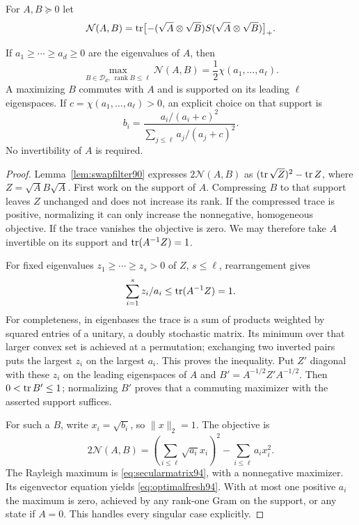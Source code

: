 For $A,B\succeq0$ let
\[
 \mathcal N(A,B)=\operatorname{tr}\bigl[-(\sqrt A\otimes\sqrt B)S
                                  (\sqrt A\otimes\sqrt B)\bigr]_+.
\]
\begin{lemma}
\label{lem:spectralleaf94}
If $a_1\ge\cdots\ge a_d\ge0$ are the eigenvalues of $A$, then
\begin{equation}\label{eq:spectralleaf94}
 \max_{B\in\mathcal D_d,\ \operatorname{rank}B\le\ell}
                  \mathcal N(A,B)
           =\frac12\chi(a_1,\ldots,a_\ell).
\end{equation}
A maximizing $B$ commutes with $A$ and is supported on its leading
$\ell$ eigenspaces.  If $c=\chi(a_1,\ldots,a_\ell)>0$, an explicit
choice on that support is
\begin{equation}\label{eq:optimalfresh94}
 b_i=\frac{a_i/(a_i+c)^2}{\sum_{j\le\ell}a_j/(a_j+c)^2}.
\end{equation}
No invertibility of $A$ is required.
\end{lemma}
\begin{proof}
Lemma~\ref{lem:swapfilter90} expresses $2\mathcal N(A,B)$ as
$(\operatorname{tr}\sqrt Z)^2-\operatorname{tr} Z$, where $Z=\sqrt A B\sqrt A$.
First work on the support of $A$.  Compressing $B$ to that support
leaves $Z$ unchanged and does not increase its rank.  If the compressed
trace is positive, normalizing it can only increase the nonnegative,
homogeneous objective.  If the trace vanishes the objective is zero.
We may therefore take $A$ invertible on its support and
$\operatorname{tr}(A^{-1}Z)=1$.

For fixed eigenvalues $z_1\ge\cdots\ge z_s>0$ of $Z$, $s\le\ell$,
rearrangement gives
\[
                  \sum_{i=1}^s z_i/a_i\le\operatorname{tr}(A^{-1}Z)=1.
\]
For completeness, in eigenbases the trace is a sum of products weighted
by squared entries of a unitary, a doubly stochastic matrix.  Its
minimum over that larger convex set is achieved at a permutation;
exchanging two inverted pairs puts the largest $z_i$ on the largest
$a_i$.  This proves the inequality.  Put $Z'$ diagonal with these
$z_i$ on the leading eigenspaces of $A$ and
$B'=A^{-1/2}Z'A^{-1/2}$.  Then $0<\operatorname{tr} B'\le1$;
normalizing $B'$ proves that a commuting maximizer with the asserted
support suffices.

For such a $B$, write $x_i=\sqrt{b_i}$, so $\|x\|_2=1$.  The objective
is
\[
 2\mathcal N(A,B)
       =\left(\sum_{i\le\ell}\sqrt{a_i}x_i\right)^2
                          -\sum_{i\le\ell}a_ix_i^2.
\]
The Rayleigh maximum is \eqref{eq:secularmatrix94}, with a nonnegative
maximizer.  Its eigenvector equation yields
\eqref{eq:optimalfresh94}.  With at most one positive $a_i$ the maximum
is zero, achieved by any rank-one Gram on the support, or any state if
$A=0$.  This handles every singular case explicitly.
\end{proof}

